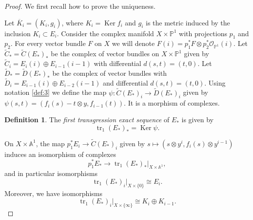 \documentclass[10pt,twoside]{article}
\numberwithin{equation}{section}
\theoremstyle{plain}
\theoremstyle{definition}
\newtheorem{definition}[equation]{Definition}
\DeclareMathOperator{\tr}{tr}
\DeclareMathOperator{\Ker}{Ker}
\begin{document}
\begin{proof}
We first recall how to prove the uniqueness. 

Let $\overline K_{i}=(K_{i},g_{i})$, where $K_{i}=\Ker f_{i}$
and $g_{i}$ is the metric induced by the inclusion $K_{i}\subset
E_{i}$. Consider the complex manifold $X\times
\mathbb{P}^{1}$ with projections $p_{1}$ and $p_{2}$. For every vector
bundle $F$ on $X$ we will denote $F(i)=p_{1}^{\ast}F\otimes
p_{2}^{\ast}\mathcal{O}_{\mathbb{P}^{1}}(i)$. Let $\widetilde 
C_{\ast}=\widetilde C(E_{\ast})_{\ast}$ be the complex
of vector bundles on $X\times \mathbb{P}^{1}$ given by
$\widetilde C_{i}=E_{i}(i)\oplus E_{i-1}(i-1)$ with differential
$d(s,t)=(t,0)$. Let $\widetilde D_{\ast}=\widetilde D(E_{\ast})_{\ast}$ be the complex
of vector bundles with 
$\widetilde D_{i}=E_{i-1}(i)\oplus E_{i-2}(i-1)$ and differential
$d(s,t)=(t,0)$. Using notation
\ref{def:3} we define the map $\psi 
\colon\widetilde C(E_{\ast})_{i}\longrightarrow \widetilde
D(E_{\ast})_{i}$ given by $\psi
(s,t)=(f_{i}(s)-t\otimes y,f_{i-1}(t))$. It is a morphism of complexes.
\begin{definition}\label{def:12}
  The \emph{first transgression exact sequence} of $E_{\ast}$ is given by
  \begin{displaymath}
    \tr_{1}(E_{\ast})_{\ast}=\Ker \psi.
  \end{displaymath}
\end{definition}

On $X\times \mathbb{A}^{1}$, the
map $p_{1}^{\ast}E_{i}\longrightarrow \widetilde C(E_{\ast})_{i}$ given by
$s\longmapsto
(s\otimes y^{i},f_{i}(s)\otimes y^{i-1})$ induces an isomorphism of
complexes
\begin{equation}
  \label{eq:59}
  p_{1}^{\ast}E_{\ast} \longrightarrow \tr_{1}(E_{\ast})_{\ast}|_{X\times
  \mathbb{A}^{1}}, 
\end{equation}
 and in particular isomorphisms
\begin{equation}
  \label{eq:57}
  \tr_{1}(E_{\ast})_{i}|_{X\times
  \{0\}}\cong E_{i}.
\end{equation}
Moreover, we have isomorphisms
\begin{equation}
  \label{eq:58}
  \tr_{1}(E_{\ast})_{i}|_{X\times
  \{\infty \}}\cong K_{i}\oplus K_{i-1}.
\end{equation}


\end{proof}
\end{document}
